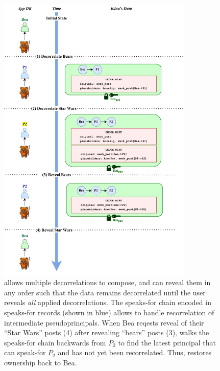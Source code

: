 \begin{figure}
\centering
    \includegraphics[width=0.83\textwidth]{figs/composition}
\caption{\sys allows multiple decorrelations to compose, and can reveal them in
    any order such that the data remains decorrelated until the user reveals \emph{all}
    applied decorrelations. The speaks-for chain encoded in
    speaks-for records (shown in blue) allows \sys to handle recorrelation of intermediate
    pseudoprincipals. When Bea reqests reveal of their ``Star Wars''
    posts (4) after revealing ``bears'' posts (3), \sys walks the speaks-for chain
    backwards from $P_2$ to find the latest principal that can speak-for $P_2$
    and has not yet been recorrelated. Thus, \sys restores ownership back to
    Bea.}
\label{f:composition-desn}
\end{figure}


